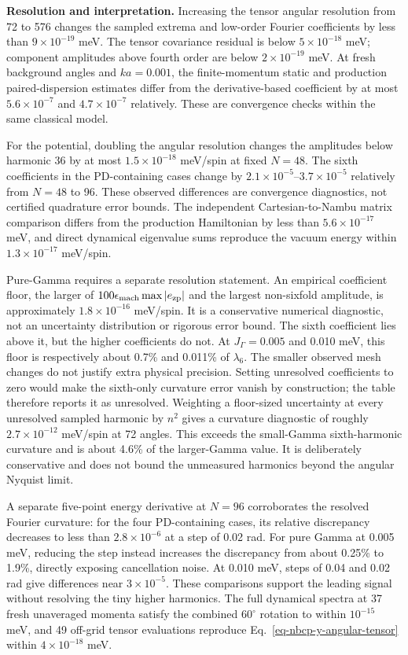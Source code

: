 \textbf{Resolution and interpretation.} Increasing the tensor angular
resolution from 72 to 576 changes the sampled extrema and low-order
Fourier coefficients by less than \(9\times10^{-19}\) meV. The tensor
covariance residual is below \(5\times10^{-18}\) meV; component
amplitudes above fourth order are below \(2\times10^{-19}\) meV. At
fresh background angles and \(ka=0.001\), the finite-momentum static and
production paired-dispersion estimates differ from the derivative-based
coefficient by at most \(5.6\times10^{-7}\) and \(4.7\times10^{-7}\)
relatively. These are convergence checks within the same classical
model.

For the potential, doubling the angular resolution changes the
amplitudes below harmonic 36 by at most \(1.5\times10^{-18}\) meV/spin
at fixed \(N=48\). The sixth coefficients in the PD-containing cases
change by \(2.1\times10^{-5}\)--\(3.7\times10^{-5}\) relatively from
\(N=48\) to 96. These observed differences are convergence diagnostics,
not certified quadrature error bounds. The independent
Cartesian-to-Nambu matrix comparison differs from the production
Hamiltonian by less than \(5.6\times10^{-17}\) meV, and direct dynamical
eigenvalue sums reproduce the vacuum energy within \(1.3\times10^{-17}\)
meV/spin.

Pure-Gamma requires a separate resolution statement. An empirical
coefficient floor, the larger of
\(100\epsilon_{\rm mach}\max|e_{\rm zp}|\) and the largest non-sixfold
amplitude, is approximately \(1.8\times10^{-16}\) meV/spin. It is a
conservative numerical diagnostic, not an uncertainty distribution or
rigorous error bound. The sixth coefficient lies above it, but the
higher coefficients do not. At \(J_\Gamma=0.005\) and 0.010 meV, this
floor is respectively about 0.7\% and 0.011\% of \(\lambda_6\). The
smaller observed mesh changes do not justify extra physical precision.
Setting unresolved coefficients to zero would make the sixth-only
curvature error vanish by construction; the table therefore reports it
as unresolved. Weighting a floor-sized uncertainty at every unresolved
sampled harmonic by \(n^2\) gives a curvature diagnostic of roughly
\(2.7\times10^{-12}\) meV/spin at 72 angles. This exceeds the
small-Gamma sixth-harmonic curvature and is about 4.6\% of the
larger-Gamma value. It is deliberately conservative and does not bound
the unmeasured harmonics beyond the angular Nyquist limit.

A separate five-point energy derivative at \(N=96\) corroborates the
resolved Fourier curvature: for the four PD-containing cases, its
relative discrepancy decreases to less than \(2.8\times10^{-6}\) at a
step of 0.02 rad. For pure Gamma at 0.005 meV, reducing the step instead
increases the discrepancy from about 0.25\% to 1.9\%, directly exposing
cancellation noise. At 0.010 meV, steps of 0.04 and 0.02 rad give
differences near \(3\times10^{-5}\). These comparisons support the
leading signal without resolving the tiny higher harmonics. The full
dynamical spectra at 37 fresh unaveraged momenta satisfy the combined
\(60^\circ\) rotation to within \(10^{-15}\) meV, and 49 off-grid tensor
evaluations reproduce Eq.~\ref{eq-nbcp-y-angular-tensor} within
\(4\times10^{-18}\) meV.

